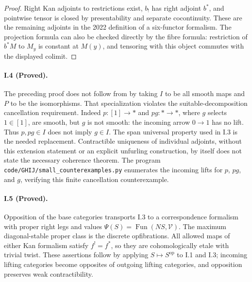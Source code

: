 \begin{proof}
Right Kan adjoints to restrictions exist, $b_!$ has right adjoint
$b^*$, and pointwise tensor is closed by presentability and
separate cocontinuity. These are the remaining adjoints in the
2022 definition of a six-functor formalism. The projection formula
can also be checked directly by the fibre formula: restriction
of $b^*M$ to $M_y$ is constant at $M(y)$, and tensoring with this
object commutes with the displayed colimit.
\end{proof}


\paragraph{I.4 (Proved).}
The preceding proof does not follow from \citet[Proposition A.5.10]{GHIJMann2022} by taking $I$ to be all smooth maps and $P$ to be the
isomorphisms. That specialization violates the suitable-decomposition
cancellation requirement. Indeed $p:[1]\to*$ and $pg:*\to*$,
where $g$ selects $1\in[1]$, are smooth, but $g$ is not smooth:
the incoming arrow $0\to1$ has no lift. Thus $p,pg\in I$ does
not imply $g\in I$. The span universal property used in I.3 is
the needed replacement. Contractible uniqueness of individual
adjoints, without this extension statement or an explicit
unfurling construction, by itself does not state the necessary
coherence theorem. The program
\texttt{code/GHIJ/small\_counterexamples.py} enumerates the
incoming lifts for $p$, $pg$, and $g$, verifying this finite
cancellation counterexample.


\paragraph{I.5 (Proved).}
Opposition of the base categories transports I.3 to a correspondence
formalism with proper right legs and values
$\Psi(S)=\operatorname{Fun}(NS,\mathcal V)$. The maximum
diagonal-stable proper class is the discrete opfibrations. All
allowed maps of either Kan formalism satisfy $f^!=f^*$, so they
are cohomologically etale with trivial twist. These assertions
follow by applying $S\mapsto S^{\mathrm{op}}$ to I.1 and I.3;
incoming lifting categories become opposites of outgoing lifting
categories, and opposition preserves weak contractibility.


